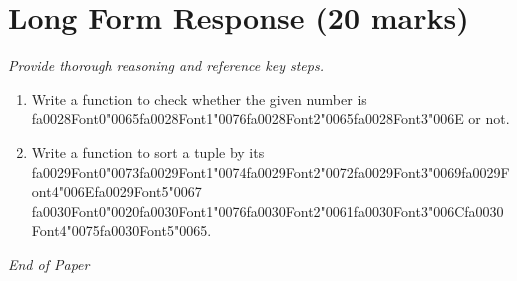 \documentclass[12pt]{article}
\begin{document}
\section*{Long Form Response (20 marks)}
\textit{Provide thorough reasoning and reference key steps.}
\begin{enumerate}[label=\arabic*.]
\item Write a function to check whether the given number is {\csname fa0028Font0\endcsname\char"0065}{\csname fa0028Font1\endcsname\char"0076}{\csname fa0028Font2\endcsname\char"0065}{\csname fa0028Font3\endcsname\char"006E} or not.
\item Write a function to sort a tuple by its {\csname fa0029Font0\endcsname\char"0073}{\csname fa0029Font1\endcsname\char"0074}{\csname fa0029Font2\endcsname\char"0072}{\csname fa0029Font3\endcsname\char"0069}{\csname fa0029Font4\endcsname\char"006E}{\csname fa0029Font5\endcsname\char"0067} {\csname fa0030Font0\endcsname\char"0020}{\csname fa0030Font1\endcsname\char"0076}{\csname fa0030Font2\endcsname\char"0061}{\csname fa0030Font3\endcsname\char"006C}{\csname fa0030Font4\endcsname\char"0075}{\csname fa0030Font5\endcsname\char"0065}.
\end{enumerate}

\vfill
\noindent\textit{End of Paper}
\end{document}
